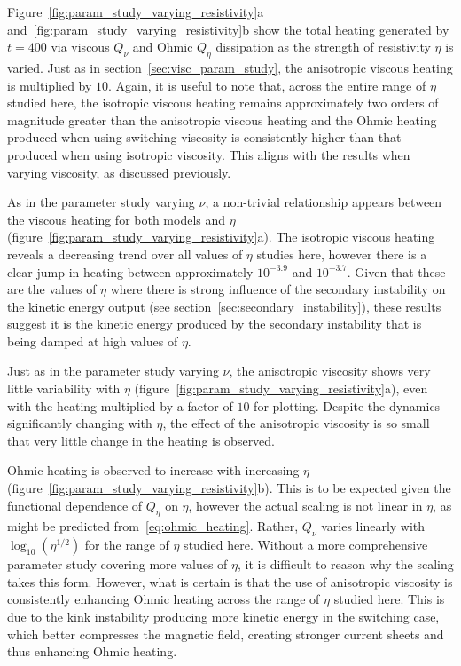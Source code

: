Figure~\ref{fig:param_study_varying_resistivity}a and~\ref{fig:param_study_varying_resistivity}b show the total heating generated by $t=400$ via viscous $Q_{\nu}$ and Ohmic $Q_{\eta}$ dissipation as the strength of resistivity $\eta$ is varied. Just as in section~\ref{sec:visc_param_study}, the anisotropic viscous heating is multiplied by $10$. Again, it is useful to note that, across the entire range of $\eta$ studied here, the isotropic viscous heating remains approximately two orders of magnitude greater than the anisotropic viscous heating and the Ohmic heating produced when using switching viscosity is consistently higher than that produced when using isotropic viscosity. This aligns with the results when varying viscosity, as discussed previously.

As in the parameter study varying $\nu$, a non-trivial relationship appears between the viscous heating for both models and $\eta$ (figure~\ref{fig:param_study_varying_resistivity}a). The isotropic viscous heating reveals a decreasing trend over all values of $\eta$ studies here, however there is a clear jump in heating between approximately $10^{-3.9}$ and $10^{-3.7}$. Given that these are the values of $\eta$ where there is strong influence of the secondary instability on the kinetic energy output (see section~\ref{sec:secondary_instability}), these results suggest it is the kinetic energy produced by the secondary instability that is being damped at high values of $\eta$.

Just as in the parameter study varying $\nu$, the anisotropic viscosity shows very little variability with $\eta$ (figure~\ref{fig:param_study_varying_resistivity}a), even with the heating multiplied by a factor of $10$ for plotting. Despite the dynamics significantly changing with $\eta$, the effect of the anisotropic viscosity is so small that very little change in the heating is observed.

Ohmic heating is observed to increase with increasing $\eta$ (figure~\ref{fig:param_study_varying_resistivity}b). This is to be expected given the functional dependence of $Q_{\eta}$ on $\eta$, however the actual scaling is not linear in $\eta$, as might be predicted from~\eqref{eq:ohmic_heating}. Rather, $Q_{\nu}$ varies linearly with $\log_{10}(\eta^{1/2})$ for the range of $\eta$ studied here. Without a more comprehensive parameter study covering more values of $\eta$, it is difficult to reason why the scaling takes this form. However, what is certain is that the use of anisotropic viscosity is consistently enhancing Ohmic heating across the range of $\eta$ studied here. This is due to the kink instability producing more kinetic energy in the switching case, which better compresses the magnetic field, creating stronger current sheets and thus enhancing Ohmic heating.

